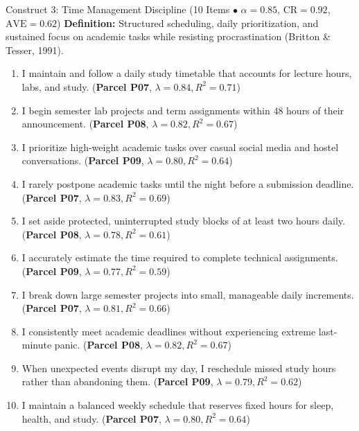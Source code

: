 \documentclass[10pt,a4paper]{article}
\begin{document}
\newpage
\begin{constructbox}{Construct 3: Time Management Discipline (10 Items $\bullet$ $\alpha = 0.85$, $\text{CR} = 0.92$, $\text{AVE} = 0.62$)}
\textbf{Definition:} Structured scheduling, daily prioritization, and sustained focus on academic tasks while resisting procrastination (Britton \& Tesser, 1991).
\begin{enumerate}[label=\textbf{Q\arabic*.}, leftmargin=2.5em, itemsep=2pt, resume]
  \item I maintain and follow a daily study timetable that accounts for lecture hours, labs, and study. \hfill (\textbf{Parcel P07}, $\lambda = 0.84, R^2 = 0.71$)
  \item I begin semester lab projects and term assignments within 48 hours of their announcement. \hfill (\textbf{Parcel P08}, $\lambda = 0.82, R^2 = 0.67$)
  \item I prioritize high-weight academic tasks over casual social media and hostel conversations. \hfill (\textbf{Parcel P09}, $\lambda = 0.80, R^2 = 0.64$)
  \item I rarely postpone academic tasks until the night before a submission deadline. \hfill (\textbf{Parcel P07}, $\lambda = 0.83, R^2 = 0.69$)
  \item I set aside protected, uninterrupted study blocks of at least two hours daily. \hfill (\textbf{Parcel P08}, $\lambda = 0.78, R^2 = 0.61$)
  \item I accurately estimate the time required to complete technical assignments. \hfill (\textbf{Parcel P09}, $\lambda = 0.77, R^2 = 0.59$)
  \item I break down large semester projects into small, manageable daily increments. \hfill (\textbf{Parcel P07}, $\lambda = 0.81, R^2 = 0.66$)
  \item I consistently meet academic deadlines without experiencing extreme last-minute panic. \hfill (\textbf{Parcel P08}, $\lambda = 0.82, R^2 = 0.67$)
  \item When unexpected events disrupt my day, I reschedule missed study hours rather than abandoning them. \hfill (\textbf{Parcel P09}, $\lambda = 0.79, R^2 = 0.62$)
  \item I maintain a balanced weekly schedule that reserves fixed hours for sleep, health, and study. \hfill (\textbf{Parcel P07}, $\lambda = 0.80, R^2 = 0.64$)
\end{enumerate}
\end{constructbox}
\end{document}
